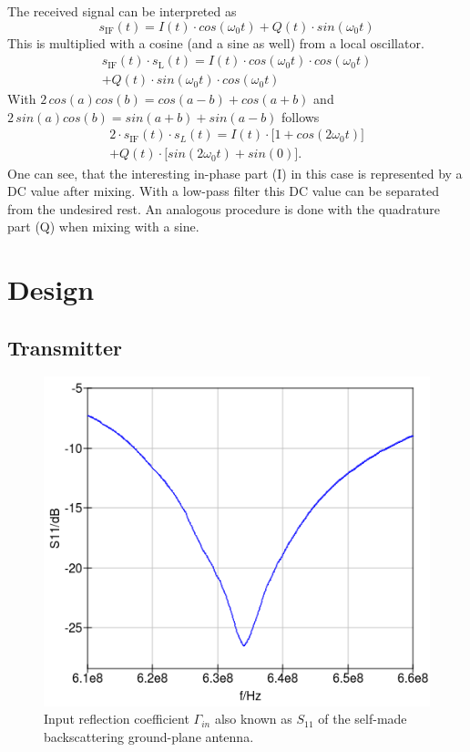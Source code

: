 \documentclass[conference]{IEEEtran}
\begin{document}
The received signal can be interpreted as
\begin{equation}
	s_{\text{IF}}(t)=I(t) \cdot cos(\omega_{0}t) + Q(t) \cdot sin(\omega_{0}t)
\end{equation}     
This is multiplied with a cosine (and a sine as well) from a local oscillator.
\begin{multline}
        s_{\text{IF}}(t) \cdot s_\text{L}(t) = I(t) \cdot cos(\omega_{0}t) \cdot cos(\omega_{0}t)\\+ Q(t) \cdot sin(\omega_{0}t) \cdot cos(\omega_{0}t)
\end{multline}
With \ensuremath{2\,cos(a)cos(b)=cos(a-b)+cos(a+b)} and \ensuremath{2\,sin(a)cos(b)=sin(a+b)+sin(a-b)} follows
\begin{multline}
        2 \cdot s_{\text{IF}}(t) \cdot s_L(t) = I(t) \cdot \bigl[1+cos(2\omega_{0}t)\bigr]\\+ Q(t) \cdot \bigl[sin(2\omega_0t)+sin(0)\bigr].
\end{multline}
One can see, that the interesting in-phase part (I) in this case is
represented by a DC value after mixing. With a low-pass filter this DC
value can be separated from the undesired rest. An analogous procedure
is done with the quadrature part (Q) when mixing with a sine.

\section{Design}

\subsection{Transmitter}
\begin{figure}[h]
\centering
\includegraphics[width=0.6\columnwidth]{./fig/s11v2}
\caption{Input reflection coefficient \ensuremath{\Gamma_{in}} also known as \ensuremath{S_{\text{11}}} of the self-made backscattering ground-plane antenna.}
\label{fig:s11}
\end{figure}
 
\end{document}
